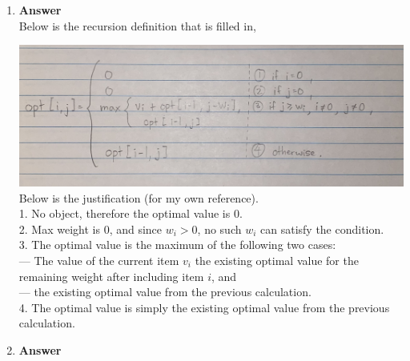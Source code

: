 \documentclass[12pt]{book}
\begin{document}
\newcommand{\reporttitle}{Assignment 3}
\newcommand{\reportauthorOne}{Kien Do}
\newcommand{\cidOne}{300163370}






\begin{enumerate}
    \item \textbf{Answer}\\
    
    Below is the recursion definition that is filled in,
    
    \includegraphics[scale=0.125]{q1.png}\\
    
    Below is the justification (for my own reference).\\
    
    1. No object, therefore the optimal value is 0.\\
    2. Max weight is 0, and since $w_i > 0$, no such $w_i$ can satisfy the condition.\\
    3. The optimal value is the maximum of the following two cases:\\
    --- The value of the current item $v_i$  the existing optimal value for the remaining weight after including item $i$, and\\
    --- the existing optimal value from the previous calculation.\\
    4. The optimal value is simply the existing optimal value from the previous calculation.\\
    
    \newpage
    
    \item \textbf{Answer}
    

\end{enumerate}
\end{document}
